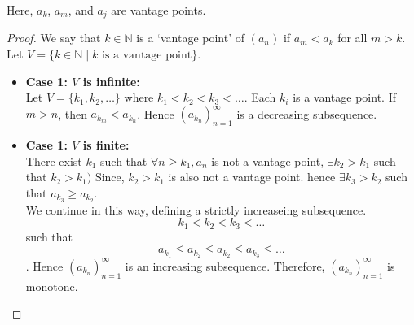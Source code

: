 \documentclass[11pt]{article}
\begin{document}
Here, \(a_k\), \(a_m\), and \(a_j\) are vantage points.

\begin{proof}
    We say that \(k \in \mathbb{N}\) is a `vantage point' of \((a_n)\) if \(a_m < a_k\) for all \(m > k\). Let \(V = \{k \in \mathbb{N} \mid k \text{ is a vantage point}\}\).
    \begin{itemize}
        \item \textbf{Case 1: \(V\) is infinite:} \\ Let \(V = \{k_1, k_2, \ldots \}\) where \(k_1 < k_2 < k_3 < \ldots\). Each \(k_i\) is a vantage point. If \(m > n\), then \(a_{{k_m}} < a_{k_n}\). Hence \((a_{k_n})_{n=1}^\infty\) is a decreasing subsequence.
        \item \textbf{Case 1: \(V\) is finite:} \\ There exist \(k_1\) such that \(\forall n \geq k_1, a_n\) is not a vantage point, \(\exists k_2 > k_1\) such that \(k_2 > k_1)\) Since, \(k_2 > k_1\) is also not a vantage point. hence \(\exists k_3 > k_2\) such that \(a_{k_3} \geq a_{k_2}\).\\ We continue in this way, defining a strictly increaseing subsequence. \[k_1 < k_2 < k_3 < \ldots\] such that \[a_{k_1} \leq a_{k_2} \leq a_{k_2} \leq a_{k_3} \leq \ldots\]. Hence \((a_{k_n})_{n=1}^\infty\) is an increasing subsequence. Therefore, \((a_{k_n})_{n=1}^\infty\) is monotone.    

    \end{itemize}
\end{proof}
\end{document}
